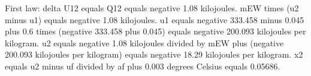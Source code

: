 First law: delta U12 equals Q12 equals negative 1.08 kilojoules.  
mEW times (u2 minus u1) equals negative 1.08 kilojoules.  
u1 equals negative 333.458 minus 0.045 plus 0.6 times (negative 333.458 plus 0.045) equals negative 200.093 kilojoules per kilogram.  
u2 equals negative 1.08 kilojoules divided by mEW plus (negative 200.093 kilojoules per kilogram) equals negative 18.29 kilojoules per kilogram.  
x2 equals u2 minus uf divided by af plus 0.003 degrees Celsius equals 0.05686.